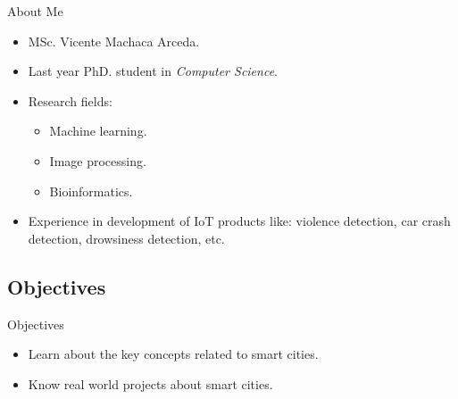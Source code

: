 \documentclass[10pt]{beamer}
\newcommand{\1}{
        	\setbeamertemplate{background}{
        		\texttt{[image: img/1]}
        		\tikz[overlay] \fill[fill opacity=0.75,fill=white] (0,0) rectangle (-\paperwidth,\paperheight);
        	}
}
\begin{document}
\begin{frame}{About Me}{}
	\begin{itemize}
		\item MSc. Vicente Machaca Arceda. \pause
		\item Last year PhD. student in \textit{Computer Science}. \pause
		\item Research fields: 
		\begin{itemize}
			\item Machine learning.
			\item Image processing.
			\item Bioinformatics.
		\end{itemize} \pause	
		\item Experience in development of IoT products like: violence detection, car crash detection, drowsiness detection, etc.
	\end{itemize}	
\end{frame}

\subsection{Objectives}

\begin{frame}{Objectives}{}	
	\begin{itemize}
		\item Learn about the key concepts related to smart cities.
		\item Know real world projects about smart cities.
	\end{itemize}
\end{frame}
\end{document}
